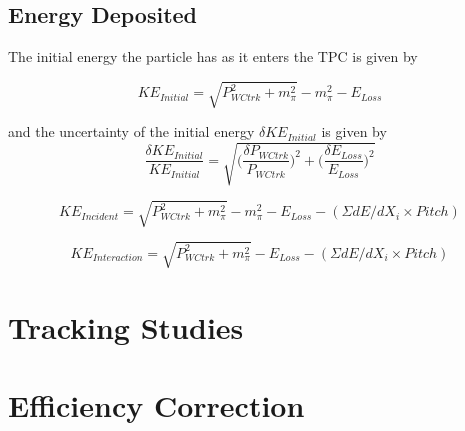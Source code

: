 \subsection{Energy Deposited}
The initial energy the particle has as it enters the TPC is given by

\begin{equation}
KE_{Initial} = \sqrt{P_{WCtrk}^2 + m_{\pi}^2} - m_{\pi}^2 - E_{Loss}
\end{equation}

and the uncertainty of the initial energy $\delta KE_{Initial}$ is given by
\begin{equation}
\frac{\delta KE_{Initial}}{KE_{Initial}} = \sqrt{\bigg( \frac{\delta P_{WCtrk}}{P_{WCtrk}} \bigg)^2 + \bigg(\frac{\delta E_{Loss}}{E_{Loss}} \bigg)^2}
\end{equation}

\begin{equation}
KE_{Incident} = \sqrt{P_{WCtrk}^2 + m_{\pi}^2} - m_{\pi}^2 - E_{Loss} - (\Sigma dE/dX_{i} \times Pitch)
\end{equation}

\begin{equation}
KE_{Interaction} = \sqrt{P_{WCtrk}^2 + m_{\pi}^2} - E_{Loss} - (\Sigma dE/dX_{i} \times Pitch)
\end{equation}


\section{Tracking Studies}

\section{Efficiency Correction}



